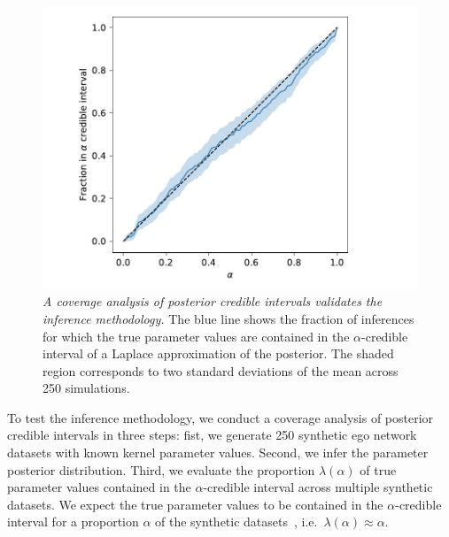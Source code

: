 \documentclass{scrartcl}
\newcommand{\titlecaption}[2]{\caption[#1]{\emph{#1} #2}}
\begin{document}
\begin{refsection}
\begin{figure}
    \includegraphics{credible-coverage}
    \titlecaption{A coverage analysis of posterior credible intervals validates the inference methodology.}{The blue line shows the fraction of inferences for which the true parameter values are contained in the $\alpha$-credible interval of a Laplace approximation of the posterior. The shaded region corresponds to two standard deviations of the mean across 250 simulations.\label{fig:credible-coverage}}
\end{figure}

To test the inference methodology, we conduct a coverage analysis of posterior credible intervals in three steps: fist, we generate 250 synthetic ego network datasets with known kernel parameter values. Second, we infer the parameter posterior distribution. Third, we evaluate the proportion $\lambda(\alpha)$ of true parameter values contained in the $\alpha$-credible interval across multiple synthetic datasets. We expect the true parameter values to be contained in the $\alpha$-credible interval for a proportion $\alpha$ of the synthetic datasets~\cite[section~10.7]{Gelman2013}, i.e.\ $\lambda(\alpha)\approx\alpha$.


\end{refsection}
\end{document}
